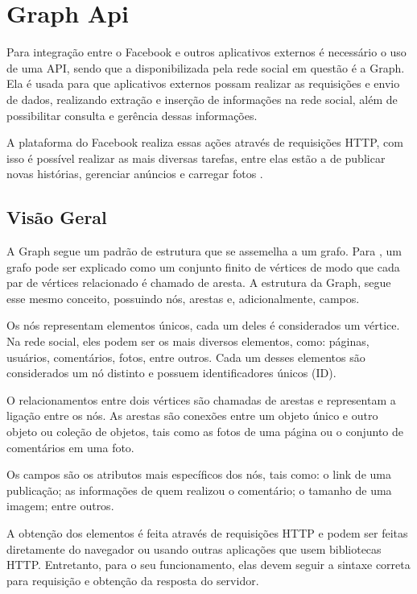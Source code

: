 \chapter[Graph Api]{Graph Api}
\label{cap:api}
Para integração entre o Facebook e outros aplicativos externos é necessário o uso de uma API, sendo que a disponibilizada pela rede social em questão é a Graph. Ela é usada para que aplicativos externos possam realizar as requisições e envio de dados, realizando extração e inserção de informações na rede social, além de possibilitar consulta e gerência dessas informações. 

A plataforma do Facebook realiza essas ações através de requisições HTTP, com isso é possível realizar as mais diversas tarefas, entre elas estão a de publicar novas histórias, gerenciar anúncios e carregar fotos \cite{facebook2018b}.

\section{Visão Geral}
A Graph segue um padrão de estrutura que se assemelha a um grafo. Para \cite{soares2014}, um grafo pode ser explicado como um conjunto finito de vértices de modo que cada par de vértices relacionado é chamado de aresta. A estrutura da Graph, segue esse mesmo conceito, possuindo nós, arestas e, adicionalmente, campos. 

Os nós representam elementos únicos, cada um deles é considerados um vértice. Na rede social, eles podem ser os mais diversos elementos, como: páginas, usuários, comentários, fotos, entre outros. Cada um desses elementos são considerados um nó distinto \cite{facebook2018b} e possuem identificadores únicos (ID). 

O relacionamentos entre dois vértices são chamadas de arestas e representam a ligação entre os nós. As arestas são conexões entre um objeto único e outro objeto ou  coleção de objetos, tais como as fotos de uma página ou o conjunto de comentários em uma foto. 

Os campos são os atributos mais específicos dos nós, tais como: o link de uma publicação; as informações de quem realizou o comentário; o tamanho de uma imagem; entre outros.

A obtenção dos elementos é feita através de requisições HTTP e podem ser feitas diretamente do navegador ou usando outras aplicações que usem bibliotecas HTTP. Entretanto, para o seu funcionamento, elas devem seguir a sintaxe correta para requisição e obtenção da resposta do servidor. 

